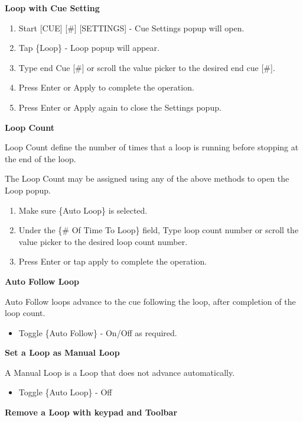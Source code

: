 \documentclass[
]{article}
\providecommand{\tightlist}{%
  \setlength{\itemsep}{0pt}\setlength{\parskip}{0pt}}
\begin{document}
\textbf{Loop with Cue Setting}

\begin{enumerate}
\def\labelenumi{\arabic{enumi}.}
\item
  Start {[}CUE{]} {[}\#{]} {[}SETTINGS{]} - Cue Settings popup will open.
\item
  Tap \{Loop\} - Loop popup will appear.
\item
  Type end Cue {[}\#{]} or scroll the value picker to the desired end cue {[}\#{]}.
\item
  Press Enter or Apply to complete the operation.
\item
  Press Enter or Apply again to close the Settings popup.
\end{enumerate}

\textbf{Loop Count}

Loop Count define the number of times that a loop is running before stopping at the end of the loop.

The Loop Count may be assigned using any of the above methods to open the Loop popup.

\begin{enumerate}
\def\labelenumi{\arabic{enumi}.}
\item
  Make sure \{Auto Loop\} is selected.
\item
  Under the \{\# Of Time To Loop\} field, Type loop count number or scroll the value picker to the desired loop count number.
\item
  Press Enter or tap apply to complete the operation.
\end{enumerate}

\textbf{Auto Follow Loop}

Auto Follow loops advance to the cue following the loop, after completion of the loop count.

\begin{itemize}
\tightlist
\item
  Toggle \{Auto Follow\} - On/Off as required.
\end{itemize}

\textbf{Set a Loop as Manual Loop}

A Manual Loop is a Loop that does not advance automatically.

\begin{itemize}
\tightlist
\item
  Toggle \{Auto Loop\} - Off
\end{itemize}

\textbf{Remove a Loop with keypad and Toolbar}
\end{document}
